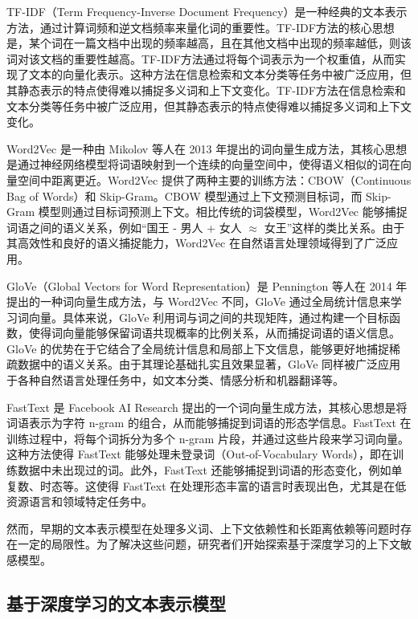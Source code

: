 \documentclass[12pt, a4paper]{ctexart}
\begin{document}
TF-IDF（Term Frequency-Inverse Document Frequency）是一种经典的文本表示方法，通过计算词频和逆文档频率来量化词的重要性\cite{SALTON1988513}。TF-IDF方法的核心思想是，某个词在一篇文档中出现的频率越高，且在其他文档中出现的频率越低，则该词对该文档的重要性越高。TF-IDF方法通过将每个词表示为一个权重值，从而实现了文本的向量化表示。这种方法在信息检索和文本分类等任务中被广泛应用，但其静态表示的特点使得难以捕捉多义词和上下文变化。TF-IDF方法在信息检索和文本分类等任务中被广泛应用，但其静态表示的特点使得难以捕捉多义词和上下文变化。

Word2Vec 是一种由 Mikolov 等人在 2013 年提出的词向量生成方法，其核心思想是通过神经网络模型将词语映射到一个连续的向量空间中，使得语义相似的词在向量空间中距离更近\cite{mikolov2013efficientestimationwordrepresentations}。Word2Vec 提供了两种主要的训练方法：CBOW（Continuous Bag of Words）和 Skip-Gram。CBOW 模型通过上下文预测目标词，而 Skip-Gram 模型则通过目标词预测上下文。相比传统的词袋模型，Word2Vec 能够捕捉词语之间的语义关系，例如“国王 - 男人 + 女人 $\approx$ 女王”这样的类比关系。由于其高效性和良好的语义捕捉能力，Word2Vec 在自然语言处理领域得到了广泛应用。

GloVe（Global Vectors for Word Representation）是 Pennington 等人在 2014 年提出的一种词向量生成方法，与 Word2Vec 不同，GloVe 通过全局统计信息来学习词向量\cite{pennington-etal-2014-glove}。具体来说，GloVe 利用词与词之间的共现矩阵，通过构建一个目标函数，使得词向量能够保留词语共现概率的比例关系，从而捕捉词语的语义信息。GloVe 的优势在于它结合了全局统计信息和局部上下文信息，能够更好地捕捉稀疏数据中的语义关系。由于其理论基础扎实且效果显著，GloVe 同样被广泛应用于各种自然语言处理任务中，如文本分类、情感分析和机器翻译等。

FastText 是 Facebook AI Research 提出的一个词向量生成方法，其核心思想是将词语表示为字符 n-gram 的组合，从而能够捕捉到词语的形态学信息\cite{bojanowski2017enrichingwordvectorssubword}。FastText 在训练过程中，将每个词拆分为多个 n-gram 片段，并通过这些片段来学习词向量。这种方法使得 FastText 能够处理未登录词（Out-of-Vocabulary Words），即在训练数据中未出现过的词。此外，FastText 还能够捕捉到词语的形态变化，例如单复数、时态等。这使得 FastText 在处理形态丰富的语言时表现出色，尤其是在低资源语言和领域特定任务中。

然而，早期的文本表示模型在处理多义词、上下文依赖性和长距离依赖等问题时存在一定的局限性。为了解决这些问题，研究者们开始探索基于深度学习的上下文敏感模型。

\subsection{基于深度学习的文本表示模型}
\end{document}
